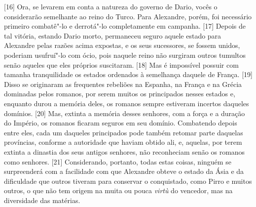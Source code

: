 {[}16{]} Ora, se levarem em conta a natureza do governo de
Dario, vocês o considerarão semelhante ao
reino do Turco. Para Alexandre, porém, foi necessário primeiro
combatê"-lo e derrotá"-lo completamente em campanha. {[}17{]} Depois de
tal vitória, estando Dario morto, permaneceu seguro aquele estado para
Alexandre pelas razões acima expostas, e os seus sucessores, se fossem
unidos, poderiam usufruí"-lo com ócio, pois naquele reino não surgiram
outros tumultos senão aqueles que eles próprios suscitaram.
{[}18{]} Mas é impossível possuir com tamanha tranquilidade os estados
ordenados à semelhança daquele de França. {[}19{]} Disso se originaram
as frequentes rebeliões na Espanha, na França e na Grécia dominadas
pelos romanos, por serem muitos os principados nesses estados e, enquanto durou a memória deles, os romanos sempre
estiveram incertos daqueles domínios. {[}20{]} Mas, extinta a memória
desses senhores, com a força e a duração do Império, os romanos ficaram
seguros em seu domínio. Combatendo depois entre eles, cada um daqueles principados pode também
retomar parte daquelas províncias, conforme a autoridade que haviam
obtido ali, e, aquelas, por terem extinta a dinastia dos seus antigos
senhores, não reconheciam senão os romanos como senhores. {[}21{]}
Considerando, portanto, todas estas coisas, ninguém se surpreenderá com
a facilidade com que Alexandre obteve o estado da Ásia e da dificuldade
que outros tiveram para conservar o conquistado, como Pirro e muitos outros,
o que não tem origem na muita ou pouca \emph{virtù} do vencedor, mas na
diversidade das matérias.

